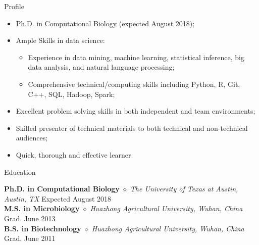 \documentclass{my_resume} %
\begin{document}

\begin{rSection}{Profile}
\renewcommand\labelitemi{$\cdot$}
\begin{itemize}
  \item Ph.D. in Computational Biology (expected August 2018);
  \vspace{-1.7em}\\
  \item Ample Skills in data science:
  \vspace{-1.7em}\\
    \begin{itemize}
      \item Experience in data mining, machine learning, statistical inference,
        big data analysis, and natural language processing;
      \vspace{-1.7em}\\
      \item Comprehensive technical/computing skills including Python, R, Git,
        C++, SQL, Hadoop, Spark;
      \vspace{-1.7em}\\
    \end{itemize}
  \item Excellent problem solving skills in both independent and team
    environments;
  \vspace{-1.7em}\\
  \item Skilled presenter of technical materials to both technical and
    non-technical audiences;
  \vspace{-1.7em}\\
  \item Quick, thorough and effective learner.
\end{itemize}
\end{rSection}


\begin{rSection}{Education}

{\bf Ph.D. in Computational Biology} {$\diamond$} {\em The University of
Texas at Austin, Austin, TX} \hfill {Expected August 2018} \\
{\bf M.S. in Microbiology} {$\diamond$} {\em Huazhong Agricultural University,
Wuhan, China} \hfill {Grad. June 2013} \\
{\bf B.S. in Biotechnology} {$\diamond$} {\em Huazhong Agricultural University,
Wuhan, China} \hfill {Grad. June 2011}
\end{rSection}
\end{document}

